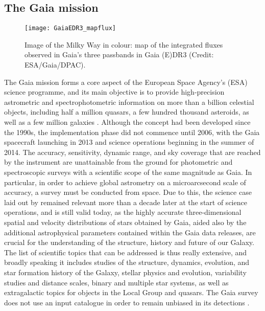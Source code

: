\documentclass[a4paper,11pt]{article}
\begin{document}
\subsection{The Gaia mission} \label{gaia}
\begin{figure}
 \centering
 \texttt{[image: GaiaEDR3\_mapflux]}
 \caption[Flux map of the Milky Way]{Image of the Milky Way in colour: map of the integrated fluxes observed in Gaia's three passbands in Gaia (E)DR3 (Credit: ESA/Gaia/DPAC).}
 \label{fig:gaia_flux_map}
\end{figure}
%
The Gaia mission forms a core aspect of the European Space Agency's (ESA) science programme, and its main objective is to provide high-precision astrometric and spectrophotometric information on more than a billion celestial objects, including half a million quasars, a few hundred thousand asteroids, as well as a few million galaxies \citep{lindegren10}. Although the concept had been developed since the 1990s, the implementation phase did not commence until 2006, with the Gaia spacecraft launching in 2013 and science operations beginning in the summer of 2014. The accuracy, sensitivity, dynamic range, and sky coverage that are reached by the instrument are unattainable from the ground for photometric and spectroscopic surveys with a scientific scope of the same magnitude
 as Gaia. In particular, in order to achieve global astrometry on a microarcsecond scale of accuracy, a survey must be conducted from space. Due to this, the science case laid out by \citet{perryman01} remained relevant more than a decade later at the start of science operations, and is still valid today, as the highly accurate three-dimensional spatial and velocity distributions of stars obtained by Gaia, aided also by the additional astrophysical parameters contained within the Gaia data releases, are crucial for the understanding of the structure, history and future of our Galaxy. The list of scientific topics that can be addressed is thus really extensive, and broadly speaking it includes studies of the structure, dynamics, evolution, and star formation history of the Galaxy, stellar physics and evolution, variability studies and distance scales, binary and multiple star systems, as well as extragalactic topics for objects in the Local Group and quasars. The Gaia survey does not use an input catalogue in order to remain unbiased in its detections \citep{gaia}.\\ \\
%
\end{document}
